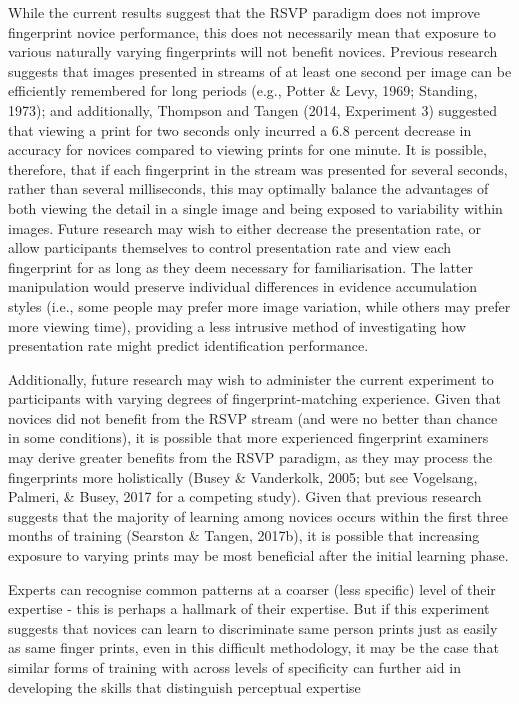 \documentclass[
  english,
  man]{apa6}
\begin{document}
While the current results suggest that the RSVP paradigm does not improve fingerprint novice performance, this does not necessarily mean that exposure to various naturally varying fingerprints will not benefit novices. Previous research suggests that images presented in streams of at least one second per image can be efficiently remembered for long periods (e.g., Potter \& Levy, 1969; Standing, 1973); and additionally, Thompson and Tangen (2014, Experiment 3) suggested that viewing a print for two seconds only incurred a 6.8 percent decrease in accuracy for novices compared to viewing prints for one minute. It is possible, therefore, that if each fingerprint in the stream was presented for several seconds, rather than several milliseconds, this may optimally balance the advantages of both viewing the detail in a single image and being exposed to variability within images. Future research may wish to either decrease the presentation rate, or allow participants themselves to control presentation rate and view each fingerprint for as long as they deem necessary for familiarisation. The latter manipulation would preserve individual differences in evidence accumulation styles (i.e., some people may prefer more image variation, while others may prefer more viewing time), providing a less intrusive method of investigating how presentation rate might predict identification performance.

Additionally, future research may wish to administer the current experiment to participants with varying degrees of fingerprint-matching experience. Given that novices did not benefit from the RSVP stream (and were no better than chance in some conditions), it is possible that more experienced fingerprint examiners may derive greater benefits from the RSVP paradigm, as they may process the fingerprints more holistically (Busey \& Vanderkolk, 2005; but see Vogelsang, Palmeri, \& Busey, 2017 for a competing study). Given that previous research suggests that the majority of learning among novices occurs within the first three months of training (Searston \& Tangen, 2017b), it is possible that increasing exposure to varying prints may be most beneficial after the initial learning phase.

Experts can recognise common patterns at a coarser (less specific) level of their expertise - this is perhaps a hallmark of their expertise. But if this experiment suggests that novices can learn to discriminate same person prints just as easily as same finger prints, even in this difficult methodology, it may be the case that similar forms of training with across levels of specificity can further aid in developing the skills that distinguish perceptual expertise
\end{document}
